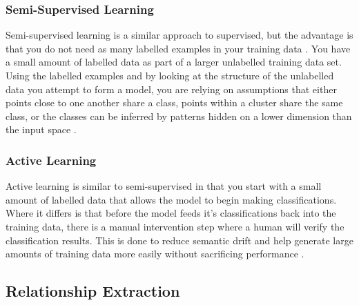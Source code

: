 \documentclass[11pt,oneside]{book}
\begin{document}
\subsubsection{Semi-Supervised Learning}

Semi-supervised learning is a similar approach to supervised, but the advantage is that you do not need as many labelled examples in your training data \citep{intro_to_semi}. You have a small amount of labelled data as part of a larger unlabelled training data set. Using the labelled examples and by looking at the structure of the unlabelled data you attempt to form a model, you are relying on assumptions that either points close to one another share a class, points within a cluster share the same class, or the classes can be inferred by patterns hidden on a lower dimension than the input space \citep{semi-supervised_learning}.

\subsubsection{Active Learning}
Active learning is similar to semi-supervised in that you start with a small amount of labelled data that allows the model to begin making classifications. Where it differs is that before the model feeds it's classifications back into the training data, there is a manual intervention step where a human will verify the classification results. This is done to reduce semantic drift and help generate large amounts of training data more easily without sacrificing performance \citep{semi_vs_active}.

\subsection{Relationship Extraction}
\end{document}
